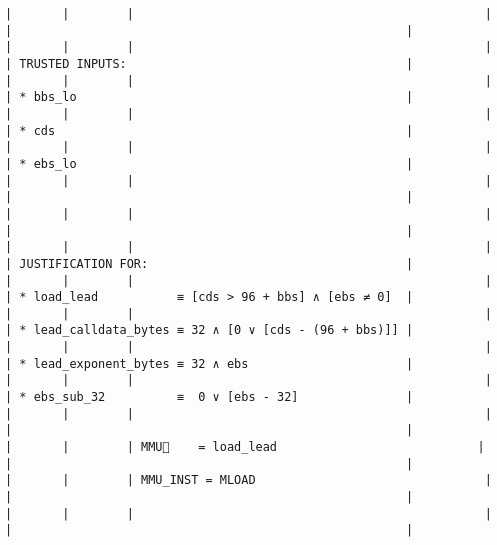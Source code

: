 \documentclass[varwidth=\maxdimen,margin=0.5cm,multi={verbatim}]{standalone}
\begin{document}
\begin{verbatim}
|       |        |                                                 |                                          |                                                       |
|       |        |                                                 |                                          | TRUSTED INPUTS:                                       |
|       |        |                                                 |                                          | * bbs_lo                                              |
|       |        |                                                 |                                          | * cds                                                 |
|       |        |                                                 |                                          | * ebs_lo                                              |
|       |        |                                                 |                                          |                                                       |
|       |        |                                                 |                                          |                                                       |
|       |        |                                                 |                                          | JUSTIFICATION FOR:                                    |
|       |        |                                                 |                                          | * load_lead           ≡ [cds > 96 + bbs] ∧ [ebs ≠ 0]  |
|       |        |                                                 |                                          | * lead_calldata_bytes ≡ 32 ∧ [0 ∨ [cds - (96 + bbs)]] |
|       |        |                                                 |                                          | * lead_exponent_bytes ≡ 32 ∧ ebs                      |
|       |        |                                                 |                                          | * ebs_sub_32          ≡  0 ∨ [ebs - 32]               |
|       |        |                                                 |                                          |                                                       |
|       |        | MMU🏴    = load_lead                            |                                          |                                                       |
|       |        | MMU_INST = MLOAD                                |                                          |                                                       |
|       |        |                                                 |                                          |                                                       |

\end{verbatim}
\end{document}
